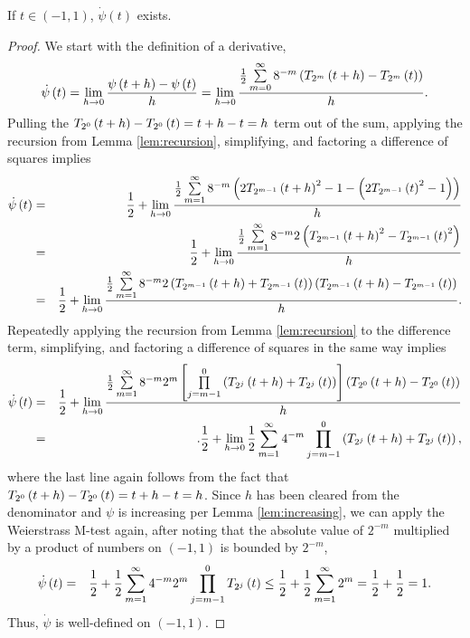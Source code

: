 \begin{proposition}
  \label{prop:derivative}
  \leanok
  If $t \in \left(-1,1\right)$, $\dot{\psi}\left(t\right)$ exists.
\end{proposition}
\begin{proof}
  \leanok
  We start with the definition of a derivative,
  \begin{eqnarray*}
    \dot{\psi}\left(t\right) = \lim\limits_{h \rightarrow 0} \frac{\psi\left(t + h\right) - \psi\left(t\right)}{h} = 
    \lim\limits_{h \rightarrow 0} \frac{\frac{1}{2} \sum\limits_{m = 0}^\infty 8^{-m} \left(T_{2^{m}}\left(t + h\right) - T_{2^{m}}\left(t\right)\right)}{h}.
  \end{eqnarray*}
  Pulling the $T_{2^{0}}\left(t + h\right) - T_{2^{0}}\left(t\right) = t + h - t = h$ term out of the sum, applying the recursion from Lemma \ref{lem:recursion}, simplifying, and factoring a difference of squares implies
  \begin{eqnarray*}
    \dot{\psi}\left(t\right) &=& \frac{1}{2} + \lim\limits_{h \rightarrow 0} \frac{\frac{1}{2}\sum\limits_{m = 1}^\infty 8^{-m} \left(2T_{2^{m - 1}}\left(t + h\right)^2 - 1 - \left(2T_{2^{m - 1}}\left(t\right)^2 - 1\right)\right)}{h} \\  
    &=& \frac{1}{2} + \lim\limits_{h \rightarrow 0} \frac{\frac{1}{2}\sum\limits_{m = 1}^\infty 8^{-m} 2\left(T_{2^{m - 1}}\left(t + h\right)^2 - T_{2^{m - 1}}\left(t\right)^2\right)}{h} \\
    &=& \frac{1}{2} + \lim\limits_{h \rightarrow 0} \frac{\frac{1}{2}\sum\limits_{m = 1}^\infty 8^{-m} 2\left(T_{2^{m - 1}}\left(t + h\right) + T_{2^{m - 1}}\left(t\right)\right) \left(T_{2^{m - 1}}\left(t + h\right) - T_{2^{m - 1}}\left(t\right)\right)}{h}.
  \end{eqnarray*}
  Repeatedly applying the recursion from Lemma \ref{lem:recursion} to the difference term, simplifying, and factoring a difference of squares in the same way implies
  \begin{eqnarray*}
    \dot{\psi}\left(t\right) &=& \frac{1}{2} + \lim\limits_{h \rightarrow 0} \frac{\frac{1}{2} \sum\limits_{m = 1}^\infty 8^{-m} 2^{m}\left[\prod\limits_{j = m - 1}^0 \left(T_{2^{j}}\left(t + h\right) + T_{2^{j}}\left(t\right)\right)\right]\left(T_{2^{0}}\left(t + h\right) - T_{2^{0}}\left(t\right)\right)}{h} \\  
    &=& .\frac{1}{2} + \lim\limits_{h \rightarrow 0} \frac{1}{2} \sum\limits_{m = 1}^\infty 4^{-m} \prod\limits_{j = m - 1}^0 \left(T_{2^{j}}\left(t + h\right) + T_{2^{j}}\left(t\right)\right),
  \end{eqnarray*}
  where the last line again follows from the fact that $T_{2^{0}}\left(t + h\right) - T_{2^{0}}\left(t\right) = t + h - t = h$. Since $h$ has been cleared from the denominator and $\psi$ is increasing per Lemma \ref{lem:increasing}, we can apply the Weierstrass M-test again, after noting that the absolute value of $2^{-m}$ multiplied by a product of numbers on $\left(-1,1\right)$ is bounded by $2^{-m}$,
  \begin{eqnarray*}
    \dot{\psi}\left(t\right)
    &=& \frac{1}{2} + \frac{1}{2} \sum\limits_{m = 1}^\infty 4^{-m} 2^m \prod\limits_{j = m - 1}^0 T_{2^{j}}\left(t\right)
    \leq \frac{1}{2} + \frac{1}{2} \sum\limits_{m = 1}^\infty 2^m = \frac{1}{2} + \frac{1}{2} = 1.
  \end{eqnarray*}
  Thus, $\dot{\psi}$ is well-defined on $\left(-1,1\right)$.
\end{proof}

